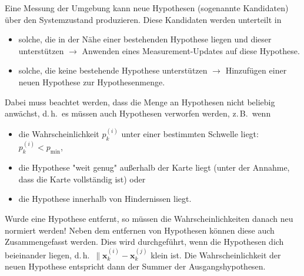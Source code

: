 \documentclass[a4paper, 11pt, accentcolor = tud3b]{tudreport}
\renewcommand{\vec}[1]{\boldsymbol{#1}}
\renewcommand{\dh}{d.\,h.~}
\newcommand{\zB}{z.\,B.~}
\begin{document}
						Eine Messung der Umgebung kann neue Hypothesen (sogenannte Kandidaten) über den Systemzustand produzieren. Diese Kandidaten werden unterteilt in
						\begin{itemize}
							\item solche, die in der Nähe einer bestehenden Hypothese liegen und dieser unterstützen \( \to \) Anwenden eines Measurement-Updates auf diese Hypothese.
							\item solche, die keine bestehende Hypothese unterstützen \( \to \) Hinzufügen einer neuen Hypothese zur Hypothesenmenge.
						\end{itemize}
						Dabei muss beachtet werden, dass die Menge an Hypothesen nicht beliebig anwächst, \dh es müssen auch Hypothesen verworfen werden, \zB wenn
						\begin{itemize}
							\item die Wahrscheinlichkeit \( p_k^{(i)} \) unter einer bestimmten Schwelle liegt: \( p_k^{(i)} < p_\text{min} \),
							\item die Hypothese "weit genug" außerhalb der Karte liegt (unter der Annahme, dass die Karte vollständig ist) oder
							\item die Hypothese innerhalb von Hindernissen liegt.
						\end{itemize}
						Wurde eine Hypothese entfernt, so müssen die Wahrscheinlichkeiten danach neu normiert werden! Neben dem entfernen von Hypothesen können diese auch Zusammengefasst werden. Dies wird durchgeführt, wenn die Hypothesen dich beieinander liegen, \dh \( \big\lVert \vec{x}_k^{(i)} - \vec{x}_k^{(j)} \) klein ist. Die Wahrscheinlichkeit der neuen Hypothese entspricht dann der Summer der Ausgangshypothesen.
					
\end{document}
